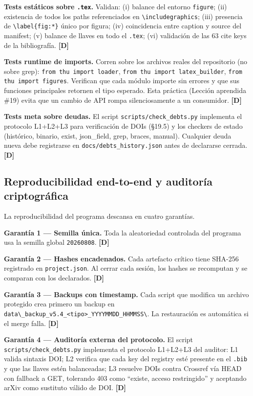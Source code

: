 ﻿\documentclass[11pt,letterpaper]{article}
\begin{document}
\textbf{Tests estáticos sobre \texttt{.tex}.} Validan: (i) balance del entorno \texttt{figure}; (ii) existencia de todos los paths referenciados en \texttt{\textbackslash includegraphics}; (iii) presencia de \texttt{\textbackslash label\{fig:*\}} único por figura; (iv) coincidencia entre caption y source del manifest; (v) balance de llaves en todo el \texttt{.tex}; (vi) validación de las 63 cite keys de la bibliografía. \textbf{[D]}

\textbf{Tests runtime de imports.} Corren sobre los archivos reales del repositorio (no sobre grep): \texttt{from thu import loader}, \texttt{from thu import latex\_builder}, \texttt{from thu import figures}. Verifican que cada módulo importe sin errores y que sus funciones principales retornen el tipo esperado. Esta práctica (Lección aprendida \#19) evita que un cambio de API rompa silenciosamente a un consumidor. \textbf{[D]}

\textbf{Tests meta sobre deudas.} El script \texttt{scripts/check\_debts.py} implementa el protocolo L1+L2+L3 para verificación de DOIs (§19.5) y los checkers de estado (histórico, binario, exist, json\_field, grep, braces, manual). Cualquier deuda nueva debe registrarse en \texttt{docs/debts\_history.json} antes de declararse cerrada. \textbf{[D]}
\subsection{Reproducibilidad end-to-end y auditoría criptográfica}
La reproducibilidad del programa descansa en cuatro garantías.

\textbf{Garantía 1 --- Semilla única.} Toda la aleatoriedad controlada del programa usa la semilla global \texttt{20260808}. \textbf{[D]}

\textbf{Garantía 2 --- Hashes encadenados.} Cada artefacto crítico tiene SHA-256 registrado en \texttt{project.json}. Al cerrar cada sesión, los hashes se recomputan y se comparan con los declarados. \textbf{[D]}

\textbf{Garantía 3 --- Backups con timestamp.} Cada script que modifica un archivo protegido crea primero un backup en \texttt{data\textbackslash\_backup\_v5.4\_<tipo>\_YYYYMMDD\_HHMMSS\textbackslash}. La restauración es automática si el merge falla. \textbf{[D]}

\textbf{Garantía 4 --- Auditoría externa del protocolo.} El script \texttt{scripts/check\_debts.py} implementa el protocolo L1+L2+L3 del auditor: L1 valida sintaxis DOI; L2 verifica que cada key del registry esté presente en el \texttt{.bib} y que las llaves estén balanceadas; L3 resuelve DOIs contra Crossref vía HEAD con fallback a GET, tolerando 403 como ``existe, acceso restringido'' y aceptando arXiv como sustituto válido de DOI. \textbf{[D]}
\end{document}
